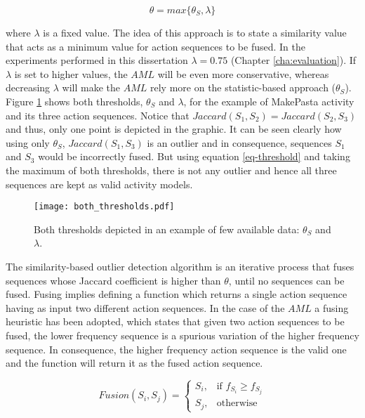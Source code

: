 \begin{equation}
\label{eq-threshold}
 \theta = max \{ \theta_S, \lambda \}
\end{equation}

\noindent where $\lambda$ is a fixed value. The idea of this approach is to state a similarity value that acts as a minimum value for action sequences to be fused. In the experiments performed in this dissertation $\lambda = 0.75$ (Chapter \ref{cha:evaluation}). If $\lambda$ is set to higher values, the $AML$ will be even more conservative, whereas decreasing $\lambda$ will make the $AML$ rely more on the statistic-based approach ($\theta_S$). Figure \ref{fig-both-thresholds} shows both thresholds, $\theta_S$ and $\lambda$, for the example of MakePasta activity and its three action sequences. Notice that $Jaccard(S_1, S_2) = Jaccard(S_2, S_3)$ and thus, only one point is depicted in the graphic. It can be seen clearly how using only $\theta_S$, $Jaccard(S_1, S_3)$ is an outlier and in consequence, sequences $S_1$ and $S_3$ would be incorrectly fused. But using equation \ref{eq-threshold} and taking the maximum of both thresholds, there is not any outlier and hence all three sequences are kept as valid activity models. 

\begin{figure}[htbp]
\centering
\texttt{[image: both\_thresholds.pdf]}
    \caption{Both thresholds depicted in an example of few available data: $\theta_S$ and $\lambda$.}
    \label{fig-both-thresholds}
\end{figure}

The similarity-based outlier detection algorithm is an iterative process that fuses sequences whose Jaccard coefficient is higher than $\theta$, until no sequences can be fused. Fusing implies defining a function which returns a single action sequence having as input two different action sequences. In the case of the $AML$ a fusing heuristic has been adopted, which states that given two action sequences to be fused, the lower frequency sequence is a spurious variation of the higher frequency sequence. In consequence, the higher frequency action sequence is the valid one and the function will return it as the fused action sequence. 

\begin{equation}
\label{eq-fusion}
 Fusion(S_i, S_j) = \left\{
\begin{array}{cc}
 S_i, & \mbox{if } f_{S_i} \geq f_{S_j} \\
 S_j, & \mbox{otherwise}
\end{array}
\right.
\end{equation}

